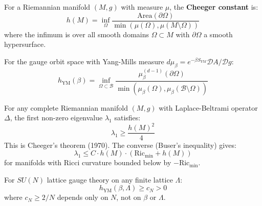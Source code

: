 \begin{definition}
\label{def:cheeger-constant}
For a Riemannian manifold $(M, g)$ with measure $\mu$, the \textbf{Cheeger constant} is:
\[
h(M) = \inf_{\Omega} \frac{\text{Area}(\partial\Omega)}{\min(\mu(\Omega), \mu(M \setminus \Omega))}
\]
where the infimum is over all smooth domains $\Omega \subset M$ with $\partial\Omega$ a smooth hypersurface.

For the gauge orbit space with Yang-Mills measure $d\mu_\beta = e^{-\beta S_{YM}} \mathcal{D}A/\mathcal{D}g$:
\[
h_{\text{YM}}(\beta) = \inf_{\Omega \subset \mathcal{B}} \frac{\mu_\beta^{(d-1)}(\partial\Omega)}{\min(\mu_\beta(\Omega), \mu_\beta(\mathcal{B} \setminus \Omega))}
\]
\end{definition}

\begin{theorem}
\label{thm:cheeger-inequality}
For any complete Riemannian manifold $(M, g)$ with Laplace-Beltrami operator $\Delta$, 
the first non-zero eigenvalue $\lambda_1$ satisfies:
\[
\lambda_1 \geq \frac{h(M)^2}{4}
\]
This is Cheeger's theorem (1970). The converse (Buser's inequality) gives:
\[
\lambda_1 \leq C \cdot h(M) \cdot (\text{Ric}_{\min} + h(M))
\]
for manifolds with Ricci curvature bounded below by $-\text{Ric}_{\min}$.
\end{theorem}

\begin{theorem}
\label{thm:cheeger-positive}
\label{thm:uniform-cheeger}
\label{thm:gap-lower-bound-novel}
For $SU(N)$ lattice gauge theory on any finite lattice $\Lambda$:
\[
h_{\text{YM}}(\beta, \Lambda) \geq c_N > 0
\]
where $c_N \geq 2/N$ depends only on $N$, not on $\beta$ or $\Lambda$.
\end{theorem}

